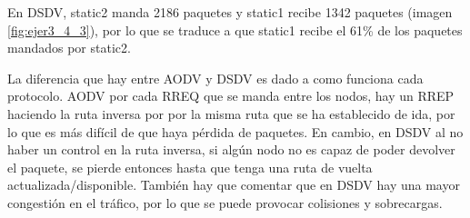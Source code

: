 En DSDV, static2 manda 2186 paquetes y static1 recibe 1342 paquetes (imagen \ref{fig:ejer3_4_3}), por lo que se traduce a que static1 recibe el 61\% de los paquetes mandados por static2. 

La diferencia que hay entre AODV y DSDV es dado a como funciona cada protocolo. AODV por cada RREQ que se manda entre los nodos, hay un RREP haciendo la ruta inversa por por la misma ruta que se ha establecido de ida, por lo que es más difícil de que haya pérdida de paquetes. En cambio, en DSDV al no haber un control en la ruta inversa, si algún nodo no es capaz de poder devolver el paquete, se pierde entonces hasta que tenga una ruta de vuelta actualizada/disponible. También hay que comentar que en DSDV hay una mayor congestión en el tráfico, por lo que se puede provocar colisiones y sobrecargas.